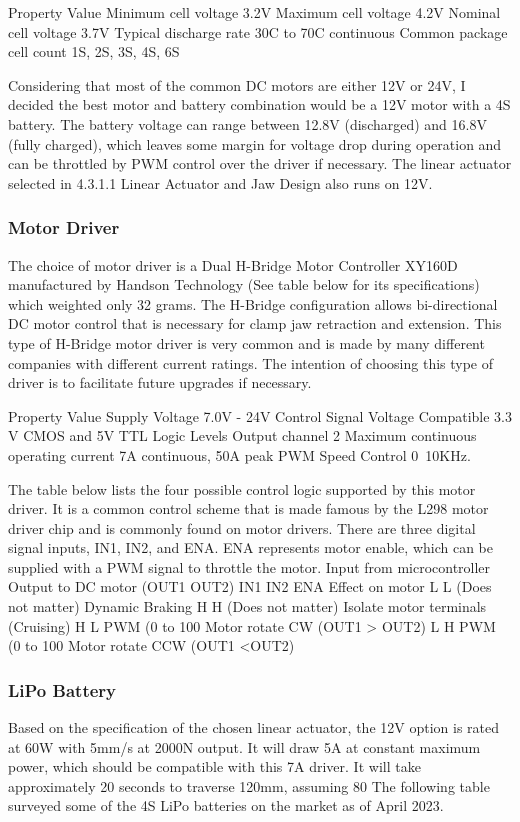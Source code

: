 Property
Value
Minimum cell voltage
3.2V
Maximum cell voltage
4.2V
Nominal cell voltage
3.7V
Typical discharge rate
30C to 70C continuous
Common package cell count
1S, 2S, 3S, 4S, 6S

Considering that most of the common DC motors are either 12V or 24V, I decided the best motor and battery combination would be a 12V motor with a 4S battery. The battery voltage can range between 12.8V (discharged) and 16.8V (fully charged), which leaves some margin for voltage drop during operation and can be throttled by PWM control over the driver if necessary. The linear actuator selected in 4.3.1.1 Linear Actuator and Jaw Design also runs on 12V.
\subsubsection{Motor Driver}
The choice of motor driver is a Dual H-Bridge Motor Controller XY160D manufactured by Handson Technology (See table below for its specifications) which weighted only 32 grams. The H-Bridge configuration allows bi-directional DC motor control that is necessary for clamp jaw retraction and extension. This type of H-Bridge motor driver is very common and is made by many different companies with different current ratings. The intention of choosing this type of driver is to facilitate future upgrades if necessary. 

Property
Value
Supply Voltage
7.0V - 24V
Control Signal Voltage
Compatible 3.3 V CMOS and  5V TTL Logic Levels
Output channel
2
Maximum continuous operating current
7A continuous, 50A peak
PWM Speed Control
0~10KHz.



The table below lists the four possible control logic supported by this motor driver. It is a common control scheme that is made famous by the L298 motor driver chip and is commonly found on motor drivers. There are three digital signal inputs, IN1, IN2, and ENA. ENA represents motor enable, which can be supplied with a PWM signal to throttle the motor.
Input from microcontroller
Output to DC motor (OUT1 OUT2)
IN1
IN2
ENA 
Effect on motor 
L
L
(Does not matter)
Dynamic Braking
H
H
(Does not matter)
Isolate motor terminals (Cruising)
H
L
PWM (0 to 100%
Motor rotate CW (OUT1 > OUT2)
L
H
PWM (0 to 100%
Motor rotate CCW (OUT1 <OUT2)


\subsubsection{LiPo Battery}
Based on the specification of the chosen linear actuator, the 12V option is rated at 60W with 5mm/s at 2000N output. It will draw 5A at constant maximum power, which should be compatible with this 7A driver. It will take approximately 20 seconds to traverse 120mm, assuming 80%
The following table surveyed some of the 4S LiPo batteries on the market as of April 2023. 

